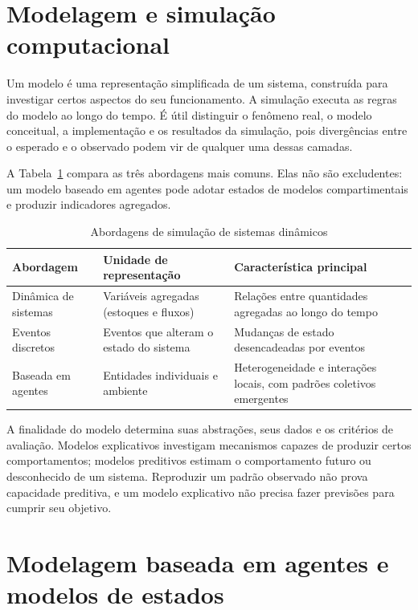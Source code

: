 \section{Modelagem e simulação computacional}

Um modelo é uma representação simplificada de um sistema, construída para investigar certos aspectos do seu funcionamento. A simulação executa as regras do modelo ao longo do tempo. É útil distinguir o fenômeno real, o modelo conceitual, a implementação e os resultados da simulação, pois divergências entre o esperado e o observado podem vir de qualquer uma dessas camadas.

A Tabela~\ref{tab:abordagens} compara as três abordagens mais comuns. Elas não são excludentes: um modelo baseado em agentes pode adotar estados de modelos compartimentais e produzir indicadores agregados.

\begin{table}[htb]
    \centering
    \caption{Abordagens de simulação de sistemas dinâmicos}
    \label{tab:abordagens}
    \begin{tabular}{p{3.6cm} p{4.6cm} p{5.6cm}}
        \hline
        \textbf{Abordagem} & \textbf{Unidade de representação} & \textbf{Característica principal} \\
        \hline
        Dinâmica de sistemas & Variáveis agregadas (estoques e fluxos) & Relações entre quantidades agregadas ao longo do tempo \\
        Eventos discretos & Eventos que alteram o estado do sistema & Mudanças de estado desencadeadas por eventos \\
        Baseada em agentes & Entidades individuais e ambiente & Heterogeneidade e interações locais, com padrões coletivos emergentes \\
        \hline
    \end{tabular}
\end{table}

A finalidade do modelo determina suas abstrações, seus dados e os critérios de avaliação. Modelos explicativos investigam mecanismos capazes de produzir certos comportamentos; modelos preditivos estimam o comportamento futuro ou desconhecido de um sistema. Reproduzir um padrão observado não prova capacidade preditiva, e um modelo explicativo não precisa fazer previsões para cumprir seu objetivo.

\section{Modelagem baseada em agentes e modelos de estados}

